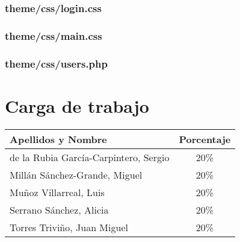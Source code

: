\documentclass[12pt,a4paper,titlepage,spanish,twoside]{book}
\begin{document}
\subsection{theme/css/login.css}


\subsection{theme/css/main.css}


\subsection{theme/css/users.php}


\appendix
\chapter{Carga de trabajo}
\begin{center}
  \begin{tabular}{p{10cm}|c}
    \textbf{Apellidos y Nombre} & \textbf{Porcentaje} \\ \hline \hline
    de la Rubia García-Carpintero, Sergio & 20\% \\
    Millán Sánchez-Grande, Miguel         & 20\% \\ 
    Muñoz Villarreal, Luis                & 20\% \\ 
    Serrano Sánchez, Alicia               & 20\% \\ 
    Torres Triviño, Juan Miguel           & 20\% \\
  \end{tabular}
\end{center}

 

\end{document}
